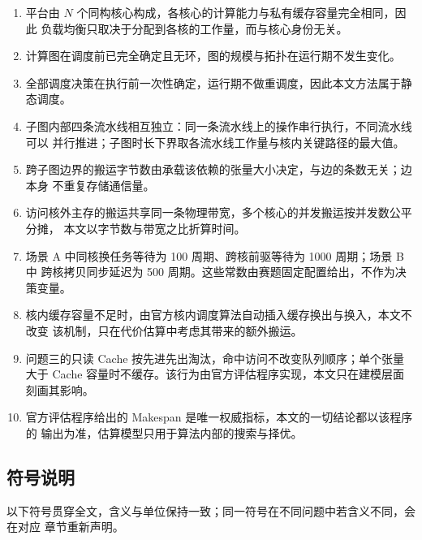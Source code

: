 \documentclass[bwprint]{gmcmthesis}
\begin{document}
\begin{enumerate}
\item 平台由 $N$ 个同构核心构成，各核心的计算能力与私有缓存容量完全相同，因此
负载均衡只取决于分配到各核的工作量，而与核心身份无关。
\item 计算图在调度前已完全确定且无环，图的规模与拓扑在运行期不发生变化。
\item 全部调度决策在执行前一次性确定，运行期不做重调度，因此本文方法属于静态调度。
\item 子图内部四条流水线相互独立：同一条流水线上的操作串行执行，不同流水线可以
并行推进；子图时长下界取各流水线工作量与核内关键路径的最大值。
\item 跨子图边界的搬运字节数由承载该依赖的张量大小决定，与边的条数无关；边本身
不重复存储通信量。
\item 访问核外主存的搬运共享同一条物理带宽，多个核心的并发搬运按并发数公平分摊，
本文以字节数与带宽之比折算时间。
\item 场景 A 中同核换任务等待为 100 周期、跨核前驱等待为 1000 周期；场景 B 中
跨核拷贝同步延迟为 500 周期。这些常数由赛题固定配置给出，不作为决策变量。
\item 核内缓存容量不足时，由官方核内调度算法自动插入缓存换出与换入，本文不改变
该机制，只在代价估算中考虑其带来的额外搬运。
\item 问题三的只读 Cache 按先进先出淘汰，命中访问不改变队列顺序；单个张量大于
Cache 容量时不缓存。该行为由官方评估程序实现，本文只在建模层面刻画其影响。
\item 官方评估程序给出的 Makespan 是唯一权威指标，本文的一切结论都以该程序的
输出为准，估算模型只用于算法内部的搜索与择优。
\end{enumerate}

\subsection{符号说明}

以下符号贯穿全文，含义与单位保持一致；同一符号在不同问题中若含义不同，会在对应
章节重新声明。
\end{document}
